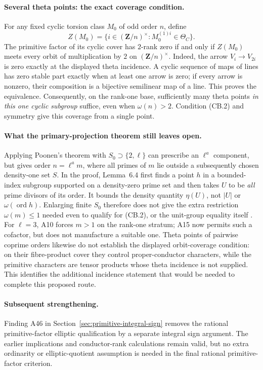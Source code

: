 \paragraph{Several theta points: the exact coverage condition.}
For any fixed cyclic torsion class $M_0$ of odd order $n$, define
\[
 Z(M_0)=\{i\in(\mathbf Z/n)^\times:
                    M_0^{(1)i}\in\Theta_C\}.
\]
The primitive factor of its cyclic cover has $2$-rank zero if and
only if $Z(M_0)$ meets every orbit of multiplication by $2$ on
$(\mathbf Z/n)^\times$. Indeed, the arrow $V_i\to V_{2i}$ is
zero exactly at the displayed theta incidence. A cyclic sequence
of maps of lines has zero stable part exactly when at least one
arrow is zero; if every arrow is nonzero, their composition is a
bijective semilinear map of a line. This proves the equivalence.
Consequently, on the rank-one base, sufficiently many theta points
\emph{in this one cyclic subgroup} suffice, even when $\omega(n)>2$.
Condition (CB.2) and symmetry give this coverage from a single point.

\paragraph{What the primary-projection theorem still leaves open.}
Applying Poonen's theorem with $S_0\supset\{2,\ell\}$ can prescribe
an $\ell^a$ component, but gives order $n=\ell^a m$, where all primes
of $m$ lie outside a subsequently chosen density-one set $S$.
In the proof, Lemma~6.4 first finds a point $h$ in a bounded-index
subgroup supported on a density-zero prime set and then takes
$U$ to be \emph{all} prime divisors of its order. It bounds the
density quantity $\eta(U)$, not $|U|$ or $\omega(\operatorname{ord}h)$.
Enlarging finite $S_0$ therefore does not give the extra restriction
$\omega(m)\le1$ needed even to qualify for (CB.2), or the unit-group
equality itself \cite[Theorem~1.8 and Lemmas~6.4--6.6]{Poonen2005}.
For $\ell=3$, A10 forces $m>1$ on the rank-one stratum; A15 now
permits such a cofactor, but does not manufacture a suitable one.
Theta points of pairwise coprime orders likewise do not establish
the displayed orbit-coverage condition: on their fibre-product
cover they control proper-conductor characters, while the primitive
characters are tensor products whose theta incidence is not supplied.
This identifies the additional incidence statement that would be
needed to complete this proposed route.

\paragraph{Subsequent strengthening.}
Finding A46 in Section~\ref{sec:primitive-integral-sign} removes the
rational primitive-factor elliptic qualification by a separate integral
sign argument. The earlier implications and conductor-rank calculations
remain valid, but no extra ordinarity or elliptic-quotient assumption
is needed in the final rational primitive-factor criterion.
